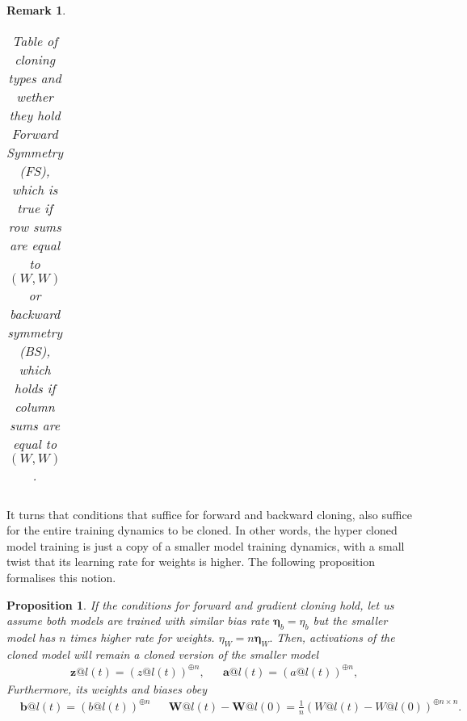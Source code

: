 \documentclass{article}
\newtheorem{proposition}{Proposition}
\newtheorem{remark}{Remark}
\newcommand{\1}{\mathbf{1}}
\newcommand{\R}[2]{\mathcal{R}_{#2}(#1)}
\renewcommand{\R}[2]{({#1})^{\oplus #2}}
\newcommand{\B}[1]{\boldsymbol{#1}}
\begin{document}
\begin{remark}
\begin{table}[h]
\begin{tabular}{|lcccc|}
\end{tabular}
\caption{\small Table of cloning types and wether they hold Forward Symmetry (FS), which is true if row sums are equal to $(W,W)$ or backward symmetry (BS), which holds if column sums are equal to $(W, W)$.}
\label{tab:cloning_types}
\end{table}
\end{remark}

It turns that conditions that suffice for forward and backward cloning, also suffice for the entire training dynamics to be cloned. In other words, the hyper cloned model training is just a copy of a smaller model training dynamics, with a small twist that its learning rate for weights is higher. The following proposition formalises this notion.  

\clearpage
\begin{proposition}\label{prop:cloning_training}
    If the conditions for forward and gradient cloning hold, let us assume both models are trained with similar bias rate $\B \eta_b = \eta_b$ but the smaller model has $n$ times higher rate for weights. $\eta_W = n \B \eta_W.$
Then, activations of the cloned model will remain a cloned version of the smaller model
\begin{align*}
    &\B z@l(t) = \R{z@l(t)}{n}, && \B a@l(t) = \R{a@l(t)}{n},
\end{align*}
Furthermore, its weights and biases obey 
\begin{align*}
    &\B b@l(t) = \R{b@l(t)}{n}
    &&\B W@l(t) - \B W@l(0)= \frac1n\R{W@l(t)-W@l(0)}{n\times n}.
\end{align*}
\end{proposition}
\end{document}
